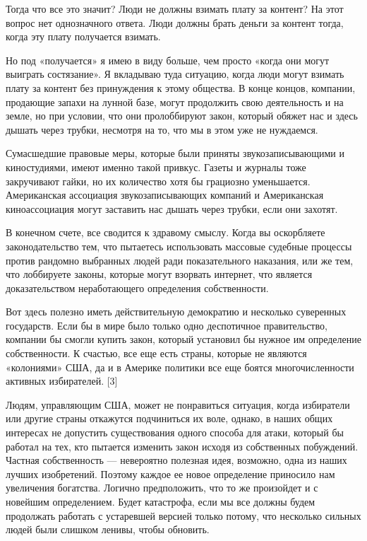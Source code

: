 \documentclass[ebook,12pt,oneside,openany]{memoir}
\begin{document}
Тогда что все это значит? Люди не должны взимать плату за контент? На
этот вопрос нет однозначного ответа. Люди должны брать деньги за
контент тогда, когда эту плату получается взимать.

Но под «получается» я имею в виду больше, чем просто «когда они могут
выиграть состязание». Я вкладываю туда ситуацию, когда люди могут
взимать плату за контент без принуждения к этому общества. В конце
концов, компании, продающие запахи на лунной базе, могут продолжить
свою деятельность и на земле, но при условии, что они пролоббируют
закон, который обяжет нас и здесь дышать через трубки, несмотря на то,
что мы в этом уже не нуждаемся.

Сумасшедшие правовые меры, которые были приняты звукозаписывающими и
киностудиями, имеют именно такой привкус. Газеты и журналы тоже
закручивают гайки, но их количество хотя бы грациозно уменьшается.
Американская ассоциация звукозаписывающих компаний и Американская
киноассоциация могут заставить нас дышать через трубки, если они
захотят.

В конечном счете, все сводится к здравому смыслу. Когда вы оскорбляете
законодательство тем, что пытаетесь использовать массовые судебные
процессы против рандомно выбранных людей ради показательного
наказания, или же тем, что лоббируете законы, которые могут взорвать
интернет, что является доказательством неработающего определения
собственности.

Вот здесь полезно иметь действительную демократию и несколько
суверенных государств. Если бы в мире было только одно деспотичное
правительство, компании бы смогли купить закон, который установил бы
нужное им определение собственности. К счастью, все еще есть страны,
которые не являются «колониями» США, да и в Америке политики все еще
боятся многочисленности активных избирателей. [3]

Людям, управляющим США, может не понравиться ситуация, когда
избиратели или другие страны откажутся подчиниться их воле, однако, в
наших общих интересах не допустить существования одного способа для
атаки, который бы работал на тех, кто пытается изменить закон исходя
из собственных побуждений. Частная собственность — невероятно полезная
идея, возможно, одна из наших лучших изобретений. Поэтому каждое ее
новое определение приносило нам увеличения богатства. Логично
предположить, что то же произойдет и с новейшим определением. Будет
катастрофа, если мы все должны будем продолжать работать с устаревшей
версией только потому, что несколько сильных людей были слишком
ленивы, чтобы обновить.
\end{document}

